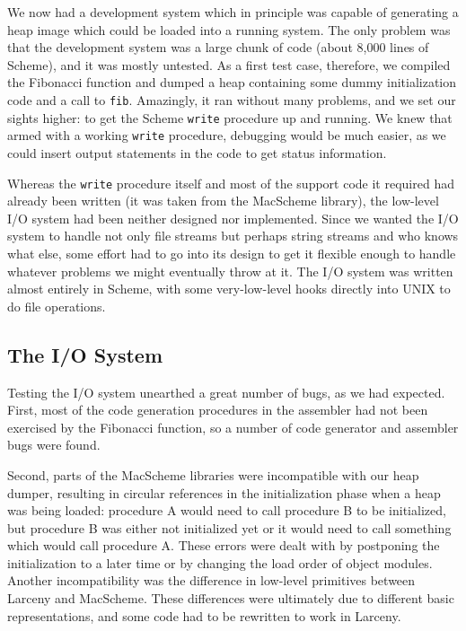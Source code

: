 We now had a development system which in principle was capable of generating
a heap image which could be loaded into a running system. The only problem
was that the development system was a large chunk of code (about 8,000 lines
of Scheme), and it was mostly untested. As a first test case, therefore, we
compiled the Fibonacci function and dumped a heap containing some dummy
initialization code and a call to {\tt fib}. Amazingly, it ran without many
problems, and we set our sights higher: to get the Scheme {\tt write}
procedure up and running.  We knew that armed with a working {\tt write}
procedure, debugging would be much easier, as we could insert output
statements in the code to get status information.

Whereas the {\tt write} procedure itself and most of the support code it
required had already been written (it was taken from the MacScheme library), the
low-level I/O system had been neither designed nor implemented. Since we
wanted the I/O system to handle not only file streams but perhaps string
streams and who knows what else, some effort had to go into its design to
get it flexible enough to handle whatever problems we might eventually throw
at it.  The I/O system was written almost entirely in Scheme, with some
very-low-level hooks directly into UNIX to do file operations.

\subsection{The I/O System}

Testing the I/O system unearthed a great number of bugs, as we had expected.
First, most of the code generation procedures in the assembler had not been
exercised by the Fibonacci function, so a number of code generator and
assembler bugs were found.

Second, parts of the MacScheme libraries were incompatible with our heap
dumper, resulting in circular references in the initialization phase when a
heap was being loaded: procedure A would need to call procedure B to be
initialized, but procedure B was either not initialized yet or it would need
to call something which would call procedure A. These errors were dealt with
by postponing the initialization to a later time or by changing the load
order of object modules. Another incompatibility was the difference in
low-level primitives between Larceny and MacScheme. These differences were
ultimately due to different basic representations, and some code had to be
rewritten to work in Larceny.

